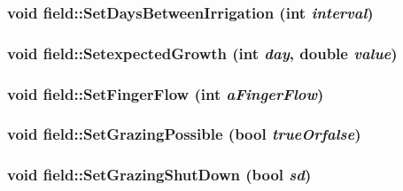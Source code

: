 \label{classfield_a1e6214765a7a3851aaa23c54e5270b8b}
\hypertarget{classfield_a56772aae8a615014781dbd3b400f812a}{
\subsubsection[{SetDaysBetweenIrrigation}]{\setlength{\rightskip}{0pt plus 5cm}void field::SetDaysBetweenIrrigation (int {\em interval})}}
\label{classfield_a56772aae8a615014781dbd3b400f812a}
\hypertarget{classfield_a7a6c11488529bfc2cada2caec2f56dc1}{
\subsubsection[{SetexpectedGrowth}]{\setlength{\rightskip}{0pt plus 5cm}void field::SetexpectedGrowth (int {\em day}, \/  double {\em value})}}
\label{classfield_a7a6c11488529bfc2cada2caec2f56dc1}
\hypertarget{classfield_af7c73512be5fcf494c02139c141af5ea}{
\subsubsection[{SetFingerFlow}]{\setlength{\rightskip}{0pt plus 5cm}void field::SetFingerFlow (int {\em aFingerFlow})}}
\label{classfield_af7c73512be5fcf494c02139c141af5ea}
\hypertarget{classfield_a68b457aa1077de7fca8e8230d69c2ed0}{
\subsubsection[{SetGrazingPossible}]{\setlength{\rightskip}{0pt plus 5cm}void field::SetGrazingPossible (bool {\em trueOrfalse})}}
\label{classfield_a68b457aa1077de7fca8e8230d69c2ed0}
\hypertarget{classfield_a72edee119271bbed91109a3c648c61c6}{
\subsubsection[{SetGrazingShutDown}]{\setlength{\rightskip}{0pt plus 5cm}void field::SetGrazingShutDown (bool {\em sd})}}
